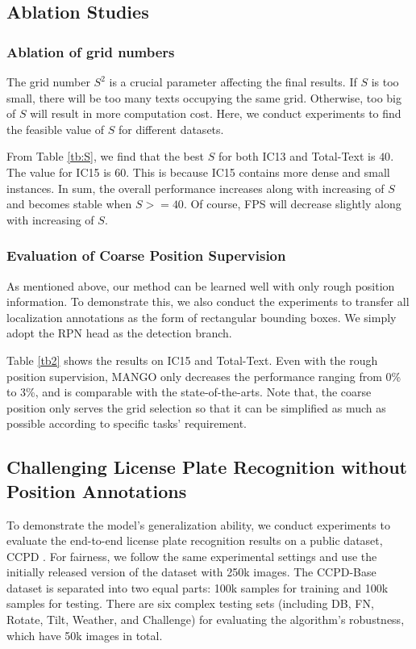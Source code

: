 \documentclass[letterpaper]{article} \usepackage{aaai21}  \usepackage{times}  \usepackage{helvet} \usepackage{courier}  \usepackage[hyphens]{url}  \usepackage{graphicx} \urlstyle{rm} \def\UrlFont{\rm}  \usepackage{natbib}  \usepackage{caption} \frenchspacing  \setlength{\pdfpagewidth}{8.5in}  \setlength{\pdfpageheight}{11in}  \usepackage{multirow}
\begin{document}
\subsection{Ablation Studies}
\subsubsection{Ablation of grid numbers}
The grid number $S^2$ is a crucial parameter affecting the final results.
If $S$ is too small, there will be too many texts occupying the same grid. Otherwise, too big of $S$ will result in more computation cost.
Here, we conduct experiments to find the feasible value of $S$ for different datasets.


From Table \ref{tb:S}, we find that the best $S$ for both IC13 and Total-Text is $40$.
The value for IC15 is $60$. This is because IC15 contains more dense and small instances.
In sum, the overall performance increases along with increasing of $S$ and becomes stable when $S$$>$$=40$.
Of course, FPS will decrease slightly along with increasing of $S$.


\subsubsection{Evaluation of Coarse Position Supervision}
As mentioned above, our method can be learned well with only rough position information.
To demonstrate this, we also conduct the experiments to transfer all localization annotations as the form of rectangular bounding boxes.  We simply adopt the RPN head as the detection branch.


Table \ref{tb2} shows the results on IC15 and Total-Text.
Even with the rough position supervision, MANGO only decreases the performance ranging from 0\% to 3\%, and is comparable with the state-of-the-arts.
Note that, the coarse position only serves the grid selection so that it can be simplified as much as possible according to specific tasks' requirement.

\subsection{Challenging License Plate Recognition without Position Annotations}
To demonstrate the model's generalization ability, we conduct experiments to evaluate the end-to-end license plate recognition results on a public dataset, CCPD \cite{xu2018towards}.
For fairness, we follow the same experimental settings and use the initially released version of the dataset with 250k images.
The CCPD-Base dataset is separated into two equal parts: 100k samples for training and 100k samples for testing.
There are six complex testing sets (including DB, FN, Rotate, Tilt, Weather, and Challenge) for evaluating the algorithm's robustness, which have 50k images in total.
\end{document}
